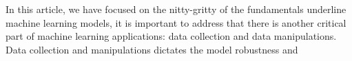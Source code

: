 In this article, we have focused on the nitty-gritty of the fundamentals underline machine learning models, it is important to address that there is another critical part of machine learning applications: data collection and data manipulations. Data collection and manipulations dictates the model robustness and  